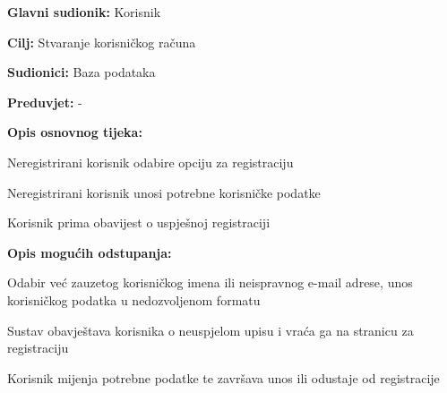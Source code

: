 		
					\noindent {}
					\begin{packed_item}
	
						\item \textbf{Glavni sudionik: }Korisnik
						\item  \textbf{Cilj:} Stvaranje korisničkog računa 
						\item  \textbf{Sudionici:} Baza podataka
						\item  \textbf{Preduvjet:} -
						\item  \textbf{Opis osnovnog tijeka:}
						
						\item[] \begin{packed_enum}
	
							\item Neregistrirani korisnik odabire opciju za registraciju
							\item Neregistrirani korisnik unosi potrebne korisničke podatke
							\item Korisnik prima obavijest o uspješnoj registraciji
						\end{packed_enum}
						
						\item  \textbf{Opis mogućih odstupanja:}
						
						\item[] \begin{packed_item}
	
							\item[2.a] Odabir već zauzetog korisničkog imena ili neispravnog e-mail adrese, unos korisničkog podatka u nedozvoljenom formatu
							\item[] \begin{packed_enum}
								
								\item Sustav obavještava korisnika o neuspjelom upisu i vraća ga na stranicu za registraciju
								\item Korisnik mijenja potrebne podatke te završava unos ili odustaje od registracije
								
							\end{packed_enum}
						\end{packed_item}
					\end{packed_item}
					
